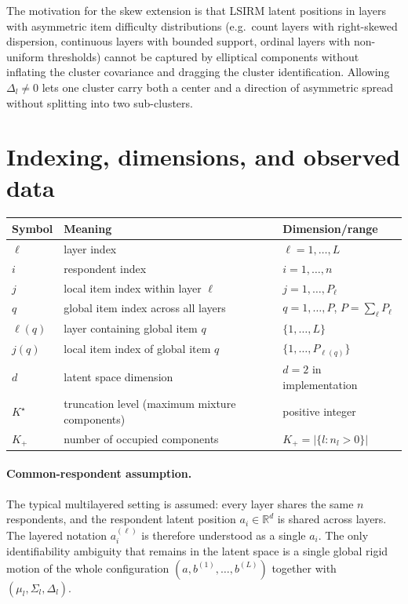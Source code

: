 \documentclass[11pt]{article}
\newcommand{\R}{\mathbb R}
\begin{document}
The motivation for the skew extension is that LSIRM latent positions in
layers with asymmetric item difficulty distributions (e.g.\ count layers
with right-skewed dispersion, continuous layers with bounded support, ordinal
layers with non-uniform thresholds) cannot be captured by elliptical
components without inflating the cluster covariance and dragging the
cluster identification.  Allowing $\Delta_l\neq 0$ lets one cluster carry
both a center and a direction of asymmetric spread without splitting into
two sub-clusters.

\section{Indexing, dimensions, and observed data}

\begin{center}
\begin{tabular}{lll}
\toprule
Symbol & Meaning & Dimension/range \\
\midrule
$\ell$ & layer index & $\ell=1,\dots,L$ \\
$i$ & respondent index & $i=1,\dots,n$ \\
$j$ & local item index within layer $\ell$ & $j=1,\dots,P_\ell$ \\
$q$ & global item index across all layers & $q=1,\dots,P$, $P=\sum_\ell P_\ell$ \\
$\ell(q)$ & layer containing global item $q$ & $\{1,\dots,L\}$ \\
$j(q)$ & local item index of global item $q$ & $\{1,\dots,P_{\ell(q)}\}$ \\
$d$ & latent space dimension & $d=2$ in implementation \\
$K^\star$ & truncation level (maximum mixture components) & positive integer \\
$K_+$ & number of occupied components & $K_+=|\{l:n_l>0\}|$ \\
\bottomrule
\end{tabular}
\end{center}

\paragraph{Common-respondent assumption.}
The typical multilayered setting is assumed: every layer shares the same
$n$ respondents, and the respondent latent position $a_i\in\R^d$ is shared
across layers.  The layered notation $a_i^{(\ell)}$ is therefore understood
as a single $a_i$.  The only identifiability ambiguity that remains in the
latent space is a single global rigid motion of the whole configuration
$(a,b^{(1)},\dots,b^{(L)})$ together with $(\mu_l,\Sigma_l,\Delta_l)$.
\end{document}
